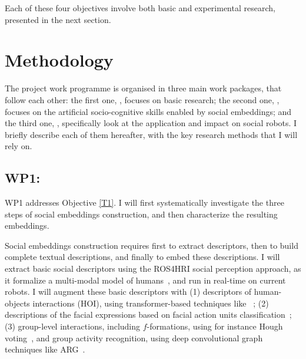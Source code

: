 Each of these four objectives involve both basic and experimental research,
presented in the next section.



\section{Methodology}


The \project project work programme is organised in three main work packages,
that follow each other: the first one, \emph{\wpOne}, focuses on basic research;
the second one, \emph{\wpTwo}, focuses on the artificial socio-cognitive skills
enabled by social embeddings; and the third one, \emph{\wpThree}, specifically
look at the application and impact on social robots.
I briefly describe each of them hereafter, with the key research methods that I
will rely on.

\subsection{WP1: \textbf{\wpOne}}

WP1 addresses Objective \ref{T1}. I will first systematically investigate the
three steps of social embeddings construction, and then characterize the
resulting embeddings.

Social embeddings construction requires first to extract descriptors, then to
build complete textual descriptions, and finally to embed these descriptions.  I
will extract basic social descriptors using the ROS4HRI social perception
approach, as it formalize a multi-modal model of humans~\cite{lemaignan2022ros},
and run in real-time on current robots. I will augment these basic descriptors
with (1) descriptors of human-objects interactions
(HOI), using transformer-based techniques like~\cite{iftekhar2022what}
; (2) descriptions of the facial expressions based on facial action units
classification~\cite{martinez2019automatic}; (3) group-level
interactions, including $f$-formations, using for instance Hough
voting~\cite{setti2015fformation}, and group activity recognition, using deep
convolutional graph techniques like ARG~\cite{wu2019learning}.

